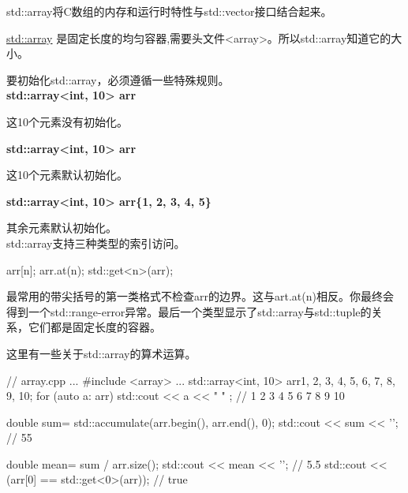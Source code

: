 

std::array将C数组的内存和运行时特性与std::vector接口结合起来。

\href{http://en.cppreference.com/w/cpp/container/array}{std::array} 是固定长度的均匀容器,需要头文件<array>。所以std::array知道它的大小。

要初始化std::array，必须遵循一些特殊规则。\\

\noindent
\textbf{std::array<int, 10> arr}

这10个元素没有初始化。

\noindent
\textbf{std::array<int, 10> arr{}}

这10个元素默认初始化。

\noindent
\textbf{std::array<int, 10> arr\{1, 2, 3, 4, 5\}}

其余元素默认初始化。\\

std::array支持三种类型的索引访问。

\begin{cpp}
arr[n];
arr.at(n);
std::get<n>(arr);
\end{cpp}

最常用的带尖括号的第一类格式不检查arr的边界。这与art.at(n)相反。你最终会得到一个std::range-error异常。最后一个类型显示了std::array与std::tuple的关系，它们都是固定长度的容器。

这里有一些关于std::array的算术运算。


\begin{cpp}
// array.cpp
...
#include <array>
...
std::array<int, 10> arr{1, 2, 3, 4, 5, 6, 7, 8, 9, 10};
for (auto a: arr) std::cout << a << " " ; // 1 2 3 4 5 6 7 8 9 10

double sum= std::accumulate(arr.begin(), arr.end(), 0);
std::cout << sum << '\n'; // 55

double mean= sum / arr.size();
std::cout << mean << '\n'; // 5.5
std::cout << (arr[0] == std::get<0>(arr)); // true
\end{cpp}




















